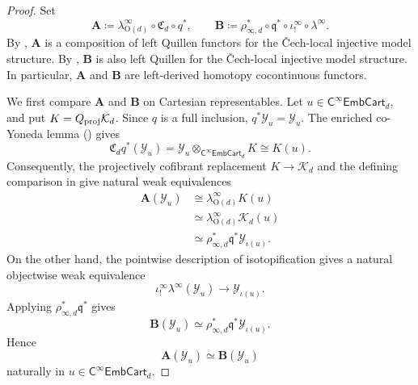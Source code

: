 \documentclass{amsart}
\newcommand{\cat}[1]{\mathsf{#1}}
\newcommand{\proj}{\textnormal{proj}}
\newcommand{\fembcartnoniso}[1]{\cat{C}^{\infty}\cat{EmbCart}_{#1}}
\newcommand{\Cc}{\mathfrak{C}}
\newcommand{\Yo}{\mathscr{Y}}
\theoremstyle{definition}
\numberwithin{equation}{subsection}
\numberwithin{subsubsection}{subsection}
\begin{document}
\begin{proof}
  Set
  \[
    \mathbf{A}
    \coloneqq
    \lambda^{\infty}_{\mathrm{O}(d)}\circ\Cc_d\circ q^{*},
    \qquad
    \mathbf{B}
    \coloneqq
    \rho_{\infty,d}^{*}\circ \mathfrak{q}^{*}\circ
    \iota_{!}^{\infty}\circ\lambda^{\infty}.
  \]
  By
  ,
  \(\mathbf{A}\) is a composition of left Quillen functors for the
  \v{C}ech-local injective model structure. By
  ,
  \(\mathbf{B}\) is also left Quillen for the \v{C}ech-local injective model
  structure. In particular, \(\mathbf{A}\) and \(\mathbf{B}\) are left-derived
  homotopy cocontinuous functors.

  We first compare \(\mathbf{A}\) and \(\mathbf{B}\) on Cartesian
  representables. Let \(u\in\fembcartnoniso{d}\), and put
  \(K=Q_{\proj}\mathcal{K}_d\). Since \(q\) is a full inclusion,
  \(q^{*}\Yo_u=\Yo_u\). The enriched co-Yoneda lemma
  () gives
  \[
    \Cc_dq^{*}(\Yo_u)
    =
    \Yo_u\otimes_{\fembcartnoniso{d}}K
    \cong
    K(u).
  \]
  Consequently, the projectively cofibrant replacement
  \(K\to\mathcal{K}_d\) and the defining comparison in
   give natural weak equivalences
  \[
    \begin{aligned}
      \mathbf{A}(\Yo_u)
      &\cong
      \lambda^{\infty}_{\mathrm{O}(d)}K(u)\\
      &\simeq
      \lambda^{\infty}_{\mathrm{O}(d)}\mathcal{K}_d(u)\\
      &\simeq
      \rho_{\infty,d}^{*}\mathfrak{q}^{*}\Yo_{\iota(u)}.
    \end{aligned}
  \]
  On the other hand, the pointwise description of isotopification gives
  a natural objectwise weak equivalence
  \[
    \iota_{!}^{\infty}\lambda^{\infty}(\Yo_u)
    \longrightarrow
    \Yo_{\iota(u)}.
  \]
  Applying \(\rho_{\infty,d}^{*}\mathfrak{q}^{*}\) gives
  \[
    \mathbf{B}(\Yo_u)
    \simeq
    \rho_{\infty,d}^{*}\mathfrak{q}^{*}\Yo_{\iota(u)}.
  \]
  Hence
  \[
    \mathbf{A}(\Yo_u)\simeq\mathbf{B}(\Yo_u)
  \]
  naturally in \(u\in\fembcartnoniso{d}\).


\end{proof}
\end{document}

